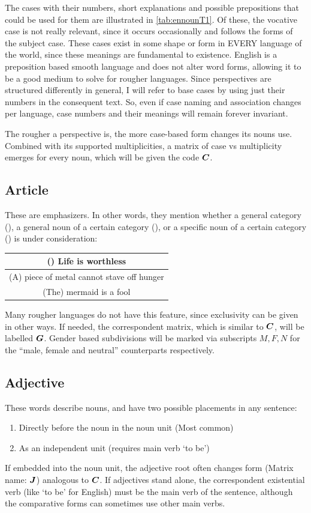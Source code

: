 The cases with their numbers, short explanations and possible prepositions that could be used for them are illustrated in \autoref{tab:ennounT1}. Of these, the vocative case is not really relevant, since it  occurs occasionally and  follows the forms of the subject case. These cases exist in some shape or form in EVERY language of the world, since these meanings are fundamental to existence. English is a preposition based smooth language and does not alter word forms, allowing it to be a good medium to solve for rougher languages. Since perspectives are structured differently in general, I will refer to base cases by using just their numbers in the consequent text. So, even if case naming and association changes per language, case numbers and their meanings will remain forever invariant. 

The rougher a perspective is, the more case-based form changes its nouns use. Combined with its supported multiplicities,  a matrix of case vs multiplicity emerges for every noun, which  will  be given the code $\boldsymbol{C}$.
\subsection{Article}
These are emphasizers. In other words, they mention whether  a general category (), a general noun of a certain category (), or a specific noun of a certain category () is under consideration:
\begin{example}
    \begin{tabular}{c}
    () Life is worthless \\\hline (A) piece of metal cannot  stave off hunger \\\hline (The) mermaid is a fool
    \end{tabular}
\end{example}
Many rougher languages do not have this feature, since exclusivity can be given in other ways.   If needed, the correspondent matrix, which is similar to $\boldsymbol{C}$, will be labelled $\boldsymbol{G}$. Gender based subdivisions  will be marked via subscripts $M,F,N$ for the \enquote{male, female and neutral} counterparts respectively.

\subsection{Adjective}
These words describe nouns, and have two possible placements in any sentence:
\begin{enumerate}
    \item Directly  before the noun in the noun unit (Most common)
    \item As an independent unit (requires main verb `to be')
\end{enumerate}
If embedded into the noun unit,   the adjective root often changes form  (Matrix name: $\boldsymbol{J}$) analogous to $\boldsymbol{C}$.  If adjectives stand alone, the correspondent existential verb (like `to be' for English) must be  the main verb of the sentence, although the comparative forms can  sometimes use other main verbs. 

